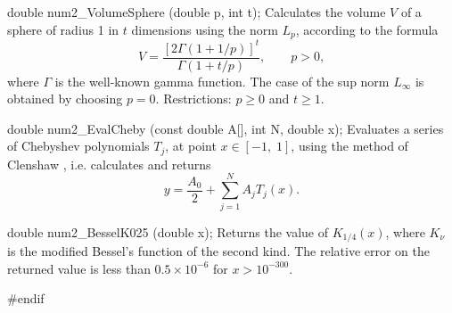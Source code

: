 double num2_VolumeSphere (double p, int t);
\endcode
\tab Calculates the volume $V$ of a sphere of radius 1 in $t$ dimensions
  using the norm $L_p$, according to the formula
$$
       V = \frac{\left[2 \Gamma(1 + 1/p)\right]^t}
             {\Gamma\left(1 + t/p\right)}, \qquad p > 0,
$$
  where $\Gamma$ is the well-known gamma function.
  The case of the sup norm $L_\infty$ is
  obtained by choosing $p=0$.
  Restrictions: $p\ge 0$ and $t\ge 1$.
  \endtab
\code


double num2_EvalCheby (const double A[], int N, double x);
\endcode
\tab Evaluates a series of Chebyshev polynomials $T_j$, at point
  $x \in [-1, \;1]$, using the method of Clenshaw \cite{mCLE62a},
   i.e. calculates and  returns
  $$
    y = \frac{A_0}2 + \sum_{j=1}^N A_j T_j(x).
  $$
\endtab
\code


double num2_BesselK025 (double x);
\endcode
\tab Returns the value of $K_{1/4}(x)$, where $K_{\nu}$ is the modified
  Bessel's
  function of the second kind.
  The relative error on the returned value is less than
  $0.5\times 10^{-6}$ for $x > 10^{-300}$.
\endtab
\code
\hide

#endif
\endhide
\endcode





